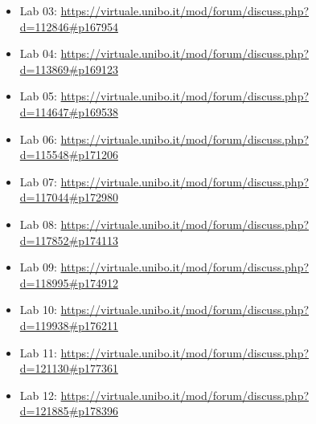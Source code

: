\documentclass[12pt, a4paper]{report}
\theoremstyle{definition}
\begin{document}
\begin{itemize}
    \item Lab 03: \url{https://virtuale.unibo.it/mod/forum/discuss.php?d=112846#p167954}
    \item Lab 04: \url{https://virtuale.unibo.it/mod/forum/discuss.php?d=113869#p169123}
    \item Lab 05: \url{https://virtuale.unibo.it/mod/forum/discuss.php?d=114647#p169538}
    \item Lab 06: \url{https://virtuale.unibo.it/mod/forum/discuss.php?d=115548#p171206}
    \item Lab 07: \url{https://virtuale.unibo.it/mod/forum/discuss.php?d=117044#p172980}
    \item Lab 08: \url{https://virtuale.unibo.it/mod/forum/discuss.php?d=117852#p174113}
    \item Lab 09: \url{https://virtuale.unibo.it/mod/forum/discuss.php?d=118995#p174912}
    \item Lab 10: \url{https://virtuale.unibo.it/mod/forum/discuss.php?d=119938#p176211}
    \item Lab 11: \url{https://virtuale.unibo.it/mod/forum/discuss.php?d=121130#p177361}
    \item Lab 12: \url{https://virtuale.unibo.it/mod/forum/discuss.php?d=121885#p178396}
\end{itemize}

\printbibliography
\end{document}

